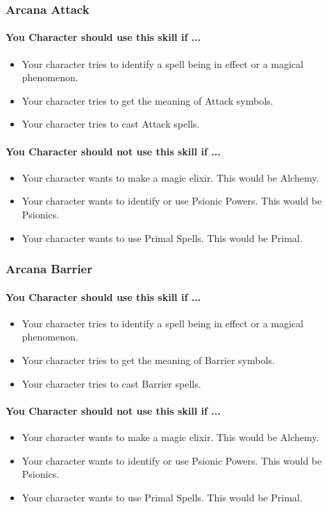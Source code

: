 \begin{multicols}{2}
\subsubsection{Arcana Attack}\label{skill:arcana_attack}
\paragraph{You Character should use this skill if ...}
\begin{itemize}
    \item Your character tries to identify a spell being in effect or a magical
        phenomenon.
    \item Your character tries to get the meaning of Attack symbols.
    \item Your character tries to cast Attack spells.
\end{itemize}
\paragraph{You Character should not use this skill if ...}
\begin{itemize}
    \item Your character wants to make a magic elixir.  This would be Alchemy.
    \item Your character wants to identify or use Psionic Powers. This would be
        Psionics.
    \item Your character wants to use Primal Spells. This would be Primal.
\end{itemize}

\subsubsection{Arcana Barrier}\label{skill:arcana_barrier}
\paragraph{You Character should use this skill if ...}
\begin{itemize}
    \item Your character tries to identify a spell being in effect or a magical
        phenomenon.
    \item Your character tries to get the meaning of Barrier symbols.
    \item Your character tries to cast Barrier spells.
\end{itemize}
\paragraph{You Character should not use this skill if ...}
\begin{itemize}
    \item Your character wants to make a magic elixir.  This would be Alchemy.
    \item Your character wants to identify or use Psionic Powers. This would be
        Psionics.
    \item Your character wants to use Primal Spells. This would be Primal.
\end{itemize}


\end{multicols}
